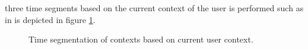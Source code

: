 three time segments based on the current context of the user is
performed such as in is depicted in figure \ref{fig:context-ml}.
\begin{figure}
\captionsetup{justification=centering,margin=2cm}
\centering
\setlength\fboxsep{0pt}
\caption{Time segmentation of contexts based on current user
context.}
\label{fig:context-ml}     
\end{figure}

